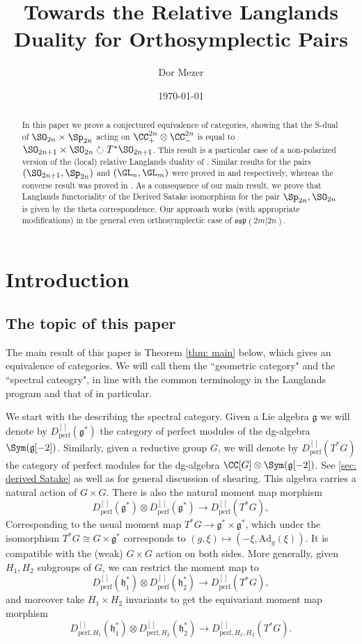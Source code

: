 \documentclass[11pt]{article}
\title{Towards the Relative Langlands Duality for Orthosymplectic Pairs}
\author{Dor Mezer}
\date{\today}
\begin{document}
\maketitle
\begin{abstract}
    In this paper we prove a conjectured equivalence of categories, showing that the S-dual of $\SO_{2n}\times \Sp_{2n}$ acting on $\CC_+^{2n}\otimes \CC_-^{2n}$ is equal to $\SO_{2n+1}\times \SO_{2n}\circlearrowright T^*\SO_{2n+1}$. This result is a particular case of a non-polarized version of the (local) relative Langlands duality of \cite{BZSV}. Similar results for the pairs $(\SO_{2n+1}, \Sp_{2n})$ and $(\GL_n, \GL_m)$ were proved in \cite{BFKT} and \cite{Fu} respectively, whereas the converse result was proved in \cite{BFT}. As a consequence of our main result, we prove that Langlands functoriality of the Derived Satake isomorphism for the pair $\Sp_{2n},\SO_{2n}$ is given by the theta correspondence.
    Our approach works (with appropriate modifications) in the general even orthosymplectic case of $\mathfrak{osp}(2m|2n)$.
\end{abstract}
\tableofcontents
\section{Introduction}
\subsection{The topic of this paper}
The main result of this paper is Theorem \ref{thm: main} below, which gives an equivalence of categories. We will call them the ``geometric category" and the ``spectral cateogry", in line with the common terminology in the Langlands program and that of \cite{BZSV} in particular.

We start with the describing the spectral category.
Given a Lie algebra $\mathfrak{g}$ we will denote by $D_\mathrm{perf}^{[]}(\mathfrak{g}^*)$ the category of perfect modules of the dg-algebra $\Sym(\mathfrak{g}[-2])$. Similarly, given a reductive group $G$, we will denote by $D_\mathrm{perf}^{[]}(T^*G)$ the category of perfect modules for the dg-algebra $\CC[G]\otimes \Sym(\mathfrak{g}[-2])$. See \ref{sec: derived Satake} as well as \cite[§6]{BZSV} for general discussion of shearing. This algebra carries a natural action of $G\times G$. There is also the natural moment map morphism $$D_\mathrm{perf}^{[]}(\mathfrak{g}^*)\otimes D_\mathrm{perf}^{[]}(\mathfrak{g}^*)\to D_\mathrm{perf}^{[]}(T^*G),$$
Corresponding to the usual moment map $T^*G\to \mathfrak{g}^*\times \mathfrak{g}^*$, which under the isomorphism $T^*G\cong G\times \mathfrak{g}^*$ corresponds to $(g,\xi)\mapsto (-\xi, \mathrm{Ad}_g(\xi))$. It is compatible with the (weak) $G\times G$ action on both sides.
More generally, given $H_1,H_2$ subgroups of $G$, we can restrict the moment map to
$$D_\mathrm{perf}^{[]}(\mathfrak{h}_1^*)\otimes D_\mathrm{perf}^{[]}(\mathfrak{h}_2^*)\to D_\mathrm{perf}^{[]}(T^*G),$$
and moreover take $H_1\times H_2$ invariants to get the equivariant moment map morphism
$$D_{\mathrm{perf}, H_1}^{[]}(\mathfrak{h}_1^*)\otimes D_{\mathrm{perf}, H_2}^{[]}(\mathfrak{h}_2^*)\to D_{\mathrm{perf}, H_1, H_2}^{[]}(T^*G).$$
\end{document}
